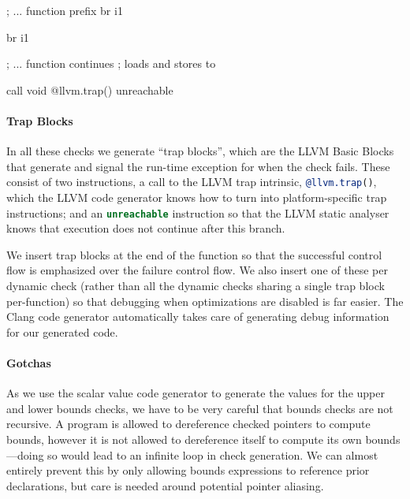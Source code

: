 \begin{code}[language=LLVM,float=ht,label=llvm:cast,
caption={Example Bounds Cast Check generated by the Checked C compiler.}]
  ; ... function prefix
  br i1 %

  br i1 %

  ; ... function continues
  ; loads and stores to %

  call void @llvm.trap()
  unreachable
\end{code}

\paragraph{Trap Blocks} In all these checks we generate ``trap
blocks'', which are the LLVM Basic Blocks that generate and signal the
run-time exception for when the check fails. These consist of two
instructions, a call to the LLVM trap intrinsic,
\lstinline[language=LLVM]|@llvm.trap()|, which the LLVM code generator
knows how to turn into platform-specific trap instructions; and an
\lstinline[language=LLVM]|unreachable| instruction so that the LLVM
static analyser knows that execution does not continue after this
branch.

We insert trap blocks at the end of the function so that the
successful control flow is emphasized over the failure control flow.
We also insert one of these per dynamic check (rather than all the
dynamic checks sharing a single trap block per-function) so that
debugging when optimizations are disabled is far easier. The Clang
code generator automatically takes care of generating debug
information for our generated code.

\paragraph{Gotchas} As we use the scalar value code generator to
generate the values for the upper and lower bounds checks, we have to
be very careful that bounds checks are not recursive. A program is
allowed to dereference checked pointers to compute bounds, however it
is not allowed to dereference itself to compute its own bounds---doing
so would lead to an infinite loop in check generation. We can almost
entirely prevent this by only allowing bounds expressions to reference
prior declarations, but care is needed around potential pointer
aliasing.


